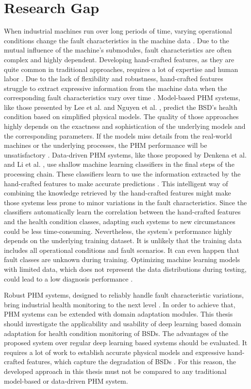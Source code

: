 \section{Research Gap}
When industrial machines run over long periods of time, varying operational conditions change the fault characteristics in the machine data \cite{AZAMFAR2020103932}. Due to the mutual influence of the machine's submodules, fault characteristics are often complex and highly dependent. Developing hand-crafted features, as they are quite common in traditional approaches, requires a lot of expertise and human labor \cite{ZHAO2019213}. Due to the lack of flexibility and robustness, hand-crafted features struggle to extract expressive information from the machine data when the corresponding fault characteristics vary over time \cite{ZHAO2019213}.
Model-based PHM systems, like those presented by Lee et al. \cite{Lee2015} and Nguyen et al. \cite{NGUYEN2019}, predict the BSD's health condition based on simplified physical models. The quality of those approaches highly depends on the exactness and sophistication of the underlying models and the corresponding parameters. If the models miss details from the real-world machines or the underlying processes, the PHM performance will be unsatisfactory \cite{ZHAO2019213}.
Data-driven PHM systems, like those proposed by Denkena et al. \cite{Denkena2021} and Li et al. \cite{LiPin2018}, use shallow machine learning classifiers in the final steps of the processing chain. These classifiers learn to use the information extracted by the hand-crafted features to make accurate predictions \cite{ZHAO2019213}. This intelligent way of combining the knowledge retrieved by the hand-crafted features might make those systems less prone to minor variations in the fault characteristics. Since the classifiers automatically learn the correlation between the hand-crafted features and the health condition classes, adapting such systems to new circumstances could be less time-consuming. Nevertheless, the system's performance highly depends on the underlying training dataset. It is unlikely that the training data includes all operational conditions and fault scenarios. It can even happen that fault classes are unknown during training. Optimizing machine learning models with limited data, which does not represent the data distributions during testing, could lead to a low diagnosis performance \cite{AZAMFAR2020103932}.

Robust PHM systems, designed to reliably handle fault characteristic variations, bring industrial health monitoring to the next level \cite{Michau2017}. In order to achieve that, PHM systems can be extended with domain adaptation modules. This thesis should investigate the applicability and usability of deep learning based domain adaptation for health condition monitoring of BSDs. The advantages of the proposed system over regular deep learning based systems should be evaluated. It requires a lot of work to establish accurate physical models and expressive hand-crafted features, which capture the degradation of BSDs \cite{ZHAO2019213}. For this reason, the developed approach in this thesis must not be compared to any traditional model-based or data-driven PHM system.

